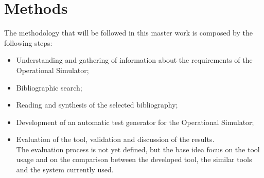 \documentclass[a4paper,12pt]{article}
\begin{document}
\section{\Large Methods}
The methodology that will be followed in this master work is composed by the following steps:

\begin{itemize}
\item Understanding and gathering of information about the requirements of the Operational Simulator;
\item Bibliographic search;
\item Reading and synthesis of the selected bibliography;
\item Development of an automatic test generator for the Operational Simulator;
\item Evaluation of the tool, validation and discussion of the results.\\[6pt]
The evaluation process is not yet defined, but the base idea focus on the tool usage and on the comparison between the developed tool, the similar tools
and the system currently used.
\end{itemize}
\end{document}
